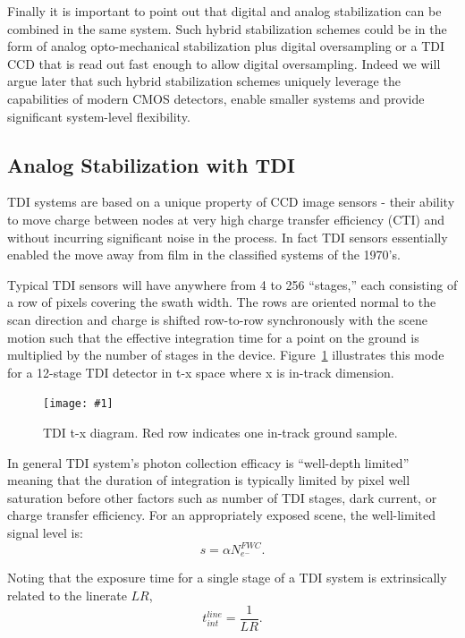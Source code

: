 \documentclass[]{spieman}  %
\newcommand{\includefigure}[3]
{
  \begin{figure}[h!tb]
  \centering
  \texttt{[image: \#1]}
  \caption[]{#3}
  \label{#2}
  \end{figure}
}
\begin{document}
Finally it is important to point out that digital and analog stabilization can be combined in the same system.  Such hybrid stabilization schemes could be in the form of analog opto-mechanical stabilization plus digital oversampling or a TDI CCD that is read out fast enough to allow digital oversampling.  Indeed we will argue later that such hybrid stabilization schemes uniquely leverage the capabilities of modern CMOS detectors, enable smaller systems and provide significant system-level flexibility.

\subsection{Analog Stabilization with TDI}

TDI systems are based on a unique property of CCD image sensors - their ability to move charge between nodes at very high charge transfer efficiency (CTI) and without incurring significant noise in the process.  In fact TDI sensors essentially enabled the move away from film in the classified systems of the 1970's.

Typical TDI sensors will have anywhere from 4 to 256 ``stages,'' each consisting of a row of pixels covering the swath width.  The rows are oriented normal to the scan direction and charge is shifted row-to-row synchronously with the scene motion such that the effective integration time for a point on the ground is multiplied by the number of stages in the device.  Figure~\ref{fig:tdi} illustrates this mode for a 12-stage TDI detector in t-x space where x is in-track dimension.

\includefigure{figures/tdi.pgf}{fig:tdi}{TDI t-x diagram.  Red row indicates one in-track ground sample.}

In general TDI system's photon collection efficacy is ``well-depth limited'' meaning that the duration of integration is typically limited by pixel well saturation before other factors such as number of TDI stages, dark current, or charge transfer efficiency.  For an appropriately exposed scene, the well-limited signal level is:
\begin{equation}
s = \alpha N_{e^-}^{FWC}
\label{eq:well_limited}.
\end{equation}

Noting that the exposure time for a single stage of a TDI system is extrinsically related to the linerate $LR$,
\begin{equation}
t_{int}^{line} = \frac{1}{LR}
\label{eq:lr_tint}.
\end{equation}
\end{document}
